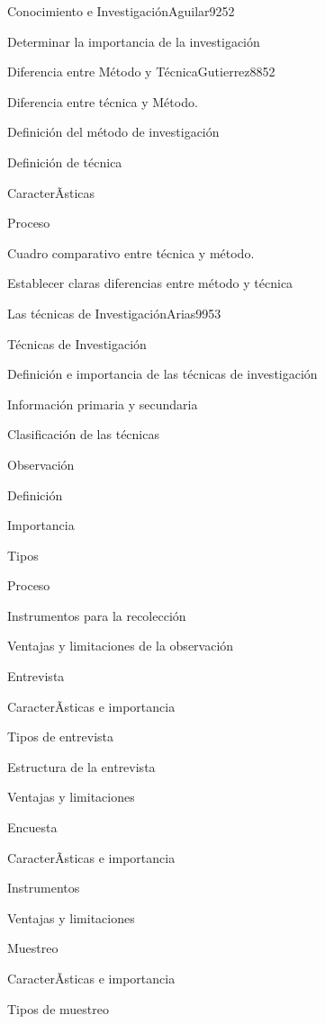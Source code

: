 \begin{syllabus}
\begin{unit}{Conocimiento e Investigación}{Aguilar92}{5}{2}
   \begin{unitgoals}
      \item Determinar la importancia de la investigación
   \end{unitgoals}
\end{unit}

\begin{unit}{Diferencia entre Método y Técnica}{Gutierrez88}{5}{2}
   \begin{topics}
      \item Diferencia entre técnica y Método.
	\item Definición del método de investigación
	\item Definición de técnica
	\item CaracterÃ­sticas
	\item Proceso
	\item Cuadro comparativo entre técnica y método.
   \end{topics}

   \begin{unitgoals}
      \item Establecer claras diferencias entre método y técnica
   \end{unitgoals}
\end{unit}

\begin{unit}{Las técnicas de Investigación}{Arias99}{5}{3}
   \begin{topics}
      \item Técnicas de Investigación
	\item Definición e importancia de las técnicas de investigación
	\item Información primaria y secundaria
	\item Clasificación de las técnicas
	\item Observación
	\item Definición
	\item Importancia
	\item Tipos
	\item Proceso
	\item Instrumentos para la recolección 
	\item Ventajas y limitaciones de la observación
	\item Entrevista
	\item CaracterÃ­sticas e importancia
	\item Tipos de entrevista
	\item Estructura de la entrevista
	\item Ventajas y limitaciones
	\item Encuesta
	\item CaracterÃ­sticas e importancia
	\item Instrumentos
	\item Ventajas y limitaciones
	\item Muestreo
	\item CaracterÃ­sticas e importancia
	\item Tipos de muestreo
   \end{topics}


\end{unit}
\end{syllabus}
